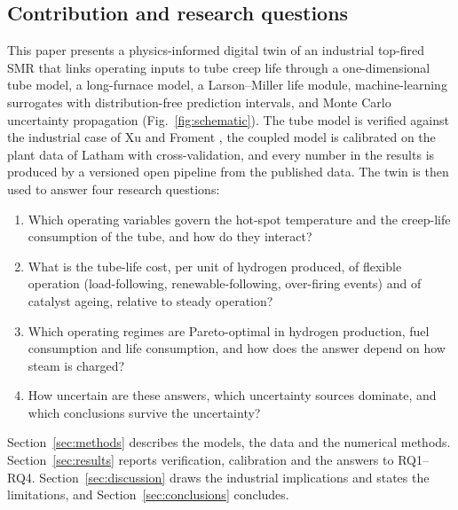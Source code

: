 \subsection{Contribution and research questions}

This paper presents a physics-informed digital twin of an industrial top-fired SMR that links operating inputs to tube creep life
through a one-dimensional tube model, a long-furnace model, a Larson--Miller life module, machine-learning surrogates with
distribution-free prediction intervals, and Monte Carlo uncertainty propagation (Fig.~\ref{fig:schematic}). The tube model is verified
against the industrial case of Xu and Froment \cite{xu1989b}, the coupled model is calibrated on the plant data of Latham
\cite{latham2008} with cross-validation, and every number in the results is produced by a versioned open pipeline from the published
data. The twin is then used to answer four research questions:

\begin{enumerate}
\item[RQ1] Which operating variables govern the hot-spot temperature and the creep-life consumption of the tube, and how do they interact?
\item[RQ2] What is the tube-life cost, per unit of hydrogen produced, of flexible operation (load-following, renewable-following,
  over-firing events) and of catalyst ageing, relative to steady operation?
\item[RQ3] Which operating regimes are Pareto-optimal in hydrogen production, fuel consumption and life consumption, and how does the
  answer depend on how steam is charged?
\item[RQ4] How uncertain are these answers, which uncertainty sources dominate, and which conclusions survive the uncertainty?
\end{enumerate}

Section~\ref{sec:methods} describes the models, the data and the numerical methods. Section~\ref{sec:results} reports verification,
calibration and the answers to RQ1--RQ4. Section~\ref{sec:discussion} draws the industrial implications and states the limitations,
and Section~\ref{sec:conclusions} concludes.
